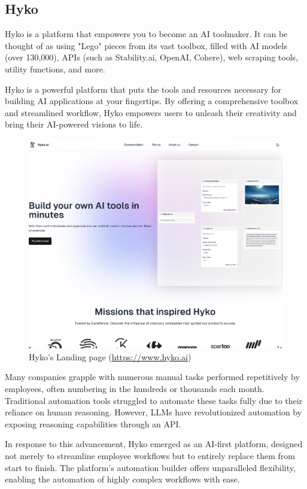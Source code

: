 \subsection{Hyko}

Hyko is a platform that empowers you to become an AI toolmaker. It can be thought of as using "Lego" pieces from its vast toolbox, filled with AI models (over 130,000), APIs (such as Stability.ai, OpenAI, Cohere), web scraping tools, utility functions, and more.

Hyko is a powerful platform that puts the tools and resources necessary for building AI applications at your fingertips. By offering a comprehensive toolbox and streamlined workflow, Hyko empowers users to unleash their creativity and bring their AI-powered visions to life.

\begin{figure}[!ht]
    \centering
    \includegraphics[width=\linewidth]{hyko.png}
    \caption{Hyko's Landing page (\url{https://www.hyko.ai})}
    \label{fig:hyko_landing_page}
\end{figure}

Many companies grapple with numerous manual tasks performed repetitively by employees, often numbering in the hundreds or thousands each month. Traditional automation tools struggled to automate these tasks fully due to their reliance on human reasoning. However, LLMs have revolutionized automation by exposing reasoning capabilities through an API.

In response to this advancement, Hyko emerged as an AI-first platform, designed not merely to streamline employee workflows but to entirely replace them from start to finish. The platform's automation builder offers unparalleled flexibility, enabling the automation of highly complex workflows with ease.

